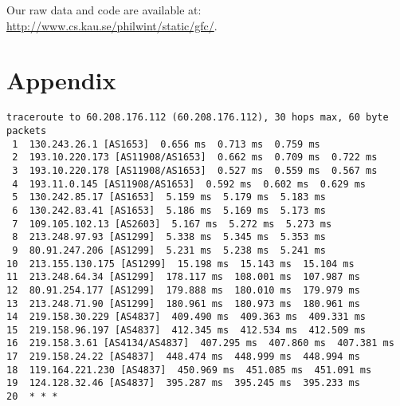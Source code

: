 \documentclass[runningheads,a4paper]{llncs}
\begin{document}
Our raw data and code are available at: \\
\url{http://www.cs.kau.se/philwint/static/gfc/}.





\appendix
\section{Appendix}
\begin{lstlisting}[basicstyle=\scriptsize\ttfamily,captionpos=b,caption={Traceroute during scan.},label=lst:tr1]
traceroute to 60.208.176.112 (60.208.176.112), 30 hops max, 60 byte packets
 1  130.243.26.1 [AS1653]  0.656 ms  0.713 ms  0.759 ms
 2  193.10.220.173 [AS11908/AS1653]  0.662 ms  0.709 ms  0.722 ms
 3  193.10.220.178 [AS11908/AS1653]  0.527 ms  0.559 ms  0.567 ms
 4  193.11.0.145 [AS11908/AS1653]  0.592 ms  0.602 ms  0.629 ms
 5  130.242.85.17 [AS1653]  5.159 ms  5.179 ms  5.183 ms
 6  130.242.83.41 [AS1653]  5.186 ms  5.169 ms  5.173 ms
 7  109.105.102.13 [AS2603]  5.167 ms  5.272 ms  5.273 ms
 8  213.248.97.93 [AS1299]  5.338 ms  5.345 ms  5.353 ms
 9  80.91.247.206 [AS1299]  5.231 ms  5.238 ms  5.241 ms
10  213.155.130.175 [AS1299]  15.198 ms  15.143 ms  15.104 ms
11  213.248.64.34 [AS1299]  178.117 ms  108.001 ms  107.987 ms
12  80.91.254.177 [AS1299]  179.888 ms  180.010 ms  179.979 ms
13  213.248.71.90 [AS1299]  180.961 ms  180.973 ms  180.961 ms
14  219.158.30.229 [AS4837]  409.490 ms  409.363 ms  409.331 ms
15  219.158.96.197 [AS4837]  412.345 ms  412.534 ms  412.509 ms
16  219.158.3.61 [AS4134/AS4837]  407.295 ms  407.860 ms  407.381 ms
17  219.158.24.22 [AS4837]  448.474 ms  448.999 ms  448.994 ms
18  119.164.221.230 [AS4837]  450.969 ms  451.085 ms  451.091 ms
19  124.128.32.46 [AS4837]  395.287 ms  395.245 ms  395.233 ms
20  * * *
\end{lstlisting}
\end{document}
